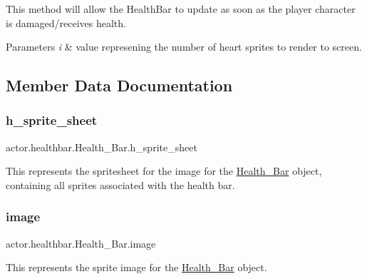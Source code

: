 This method will allow the Health\+Bar to update as soon as the player character is damaged/receives health. 
\begin{DoxyParams}{Parameters}
{\em i} & value represening the number of heart sprites to render to screen. \\
\hline
\end{DoxyParams}


\subsection{Member Data Documentation}
\mbox{\label{classactor_1_1healthbar_1_1_health___bar_a75ae2266b6d6757be66530b63f413fbd}} 
\subsubsection{\texorpdfstring{h\+\_\+sprite\+\_\+sheet}{h\_sprite\_sheet}}
{\footnotesize\ttfamily actor.\+healthbar.\+Health\+\_\+\+Bar.\+h\+\_\+sprite\+\_\+sheet}



This represents the spritesheet for the image for the \hyperlink{classactor_1_1healthbar_1_1_health___bar}{Health\+\_\+\+Bar} object, containing all sprites associated with the health bar. 

\mbox{\label{classactor_1_1healthbar_1_1_health___bar_a46e7454053636308c9a17dd63e73a8ee}} 
\subsubsection{\texorpdfstring{image}{image}}
{\footnotesize\ttfamily actor.\+healthbar.\+Health\+\_\+\+Bar.\+image}



This represents the sprite image for the \hyperlink{classactor_1_1healthbar_1_1_health___bar}{Health\+\_\+\+Bar} object. 

